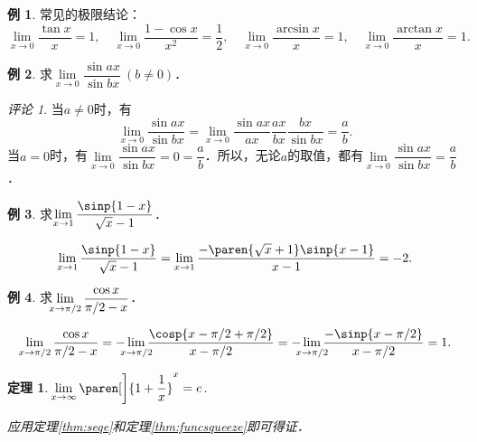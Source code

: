 \documentclass[a4paper,punct=CCT]{ctexbook}
\makeatletter
\newtheorem*{theorem*}{定理}
\theoremstyle{definition}
\newtheorem*{example*}{例}
\theoremstyle{remark}
\newtheorem*{remark}{评论}
\renewenvironment{proof}[1][\proofname]{\par
  \pushQED{\qed}%
  \normalfont \topsep6\p@\@plus6\p@\relax
  \trivlist
  \item[]\ignorespaces
}{%
  \popQED\endtrivlist\@endpefalse
}
\makeatother
\begin{document}
\begin{example*}
  常见的极限结论：
  \begin{equation*}
    \lim_{x\to0} \frac{\tan x}{x} = 1,
    \quad
    \lim_{x\to0} \frac{1 - \cos x}{x^2} = \frac12,
    \quad
    \lim_{x\to0} \frac{\arcsin x}{x} = 1,
    \quad
    \lim_{x\to0} \frac{\arctan x}{x} = 1.
  \end{equation*}
\end{example*}

\begin{example*}
  求\(\lim\limits_{x\to0} \dfrac{\sin ax}{\sin bx}\ (b \ne 0)\)．

  \begin{remark}
    当\(a \ne 0\)时，有
    \begin{equation*}
      \lim_{x\to0} \frac{\sin ax}{\sin bx}
      = \lim_{x\to0} \frac{\sin ax}{ax} \frac{ax}{bx} \frac{bx}{\sin bx}
      = \frac ab.
    \end{equation*}
    当\(a = 0\)时，有\(\lim\limits_{x\to0} \dfrac{\sin ax}{\sin bx} = 0 = \dfrac ab\)．所以，无论\(a\)的取值，都有\(\lim\limits_{x\to0} \dfrac{\sin ax}{\sin bx} = \dfrac ab\)．
  \end{remark}
\end{example*}

\begin{example*}
  求\(\lim\limits_{x\to1} \dfrac{\sinp{1-x}}{\sqrt x - 1}\)．\rule{0ex}{3.5ex}

  \begin{equation*}
    \lim_{x\to1} \frac{\sinp{1-x}}{\sqrt x - 1}
    = \lim_{x\to1} \frac{-\paren{\sqrt x + 1} \sinp{x-1}}{x - 1}
    = -2.
  \end{equation*}
\end{example*}

\begin{example*}
  求\(\;\smashoperator[l]{\lim\limits_{x\to\pi/2}} \dfrac{\cos x}{\pi/2 - x}\)．\rule{0ex}{3.5ex}

  \begin{equation*}
    \lim_{x\to\pi/2} \frac{\cos x}{\pi/2 - x}
    = - \smashoperator{\lim_{x\to\pi/2}} \frac{\cosp{x-\pi/2+\pi/2}}{x - \pi/2}
    = - \smashoperator{\lim_{x\to\pi/2}} \frac{-\sinp{x-\pi/2}}{x-\pi/2}
    = 1.
  \end{equation*}
\end{example*}

\begin{theorem*}
  \(\!\lim\limits_{x\to\infty} \paren[\bigg]{1 + \dfrac1x}^x = e\).\rule{0ex}{3.5ex}

  \begin{proof}
    应用定理\ref{thm:seqe}和定理\ref{thm:funcsqueeze}即可得证．
  \end{proof}
\end{theorem*}
\end{document}
